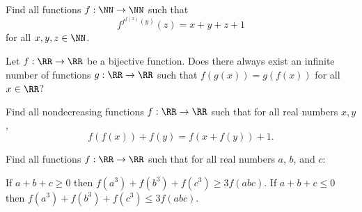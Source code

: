 \begin{probEG}[ELMO 2021/1]
  Find all functions $f:\NN\to\NN$ such that
  \[f^{f^{f(x)}(y)}(z)=x+y+z+1\]
  for all $x,y,z\in\NN$.
\end{probEG}

\begin{probEG}
  Let $f:\RR\to\RR$ be a bijective function. Does there always exist an infinite
  number of functions $g:\RR\to\RR$ such that $f(g(x))=g(f(x))$ for all
  $x\in\RR$?
\end{probEG}

\begin{probMG}
  Find all nondecreasing functions $f:\RR\to\RR$ such that for all real numbers
  $x,y$,
  \[f(f(x))+f(y)=f(x+f(y))+1.\]
\end{probMG}

\begin{probM}
  Find all functions $f:\RR\to\RR$ such that for all real numbers $a$, $b$, and
  $c$:
  \begin{enumerate}[(i)]
    \ii If $a+b+c\ge 0$ then $f(a^3)+f(b^3)+f(c^3)\ge 3f(abc).$
    \ii If $a+b+c\le 0$ then $f(a^3)+f(b^3)+f(c^3)\le 3f(abc).$
  \end{enumerate}
\end{probM}
